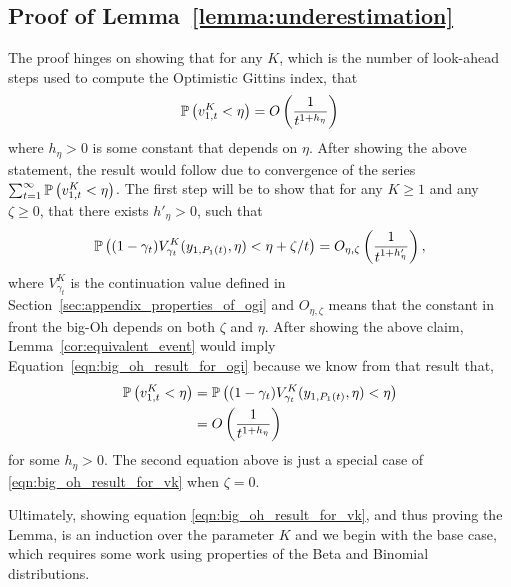 \subsection{Proof of Lemma~\ref{lemma:underestimation}} \label{proof:underestimation_proof}
\begin{myproof}[Proof.]
	The proof hinges on showing that for any $K$, which is the number of look-ahead steps used to compute the Optimistic Gittins index, that
	\begin{equation} \label{eqn:big_oh_result_for_ogi}
	\P{v^K_{1,t} < \eta} = O\left(\frac{1}{t^{1 + h_\eta}}\right)
	\end{equation}
	where $h_\eta > 0$ is some constant that depends on $\eta$. After showing the above statement, the result would follow due to convergence of the series $\sum_{t=1}^\infty \P{v^K_{1,t} < \eta}$. The first step will be to show that for any $K \ge 1$ and any $\zeta \ge 0$, that there exists $h'_\eta > 0$, such that
	\begin{equation} \label{eqn:big_oh_result_for_vk}
		\P{(1-\gamma_t)V^K_{\gamma_t}(y_{1,\Nt{1}}, \eta) < \eta + \zeta/t} = O_{\eta,\zeta}\left(\frac{1}{t^{1 + h'_\eta}}\right),
	\end{equation}
	where $V^K_{\gamma_t}$ is the continuation value defined in Section~\ref{sec:appendix_properties_of_ogi} and $O_{\eta,\zeta}$ means that the constant in front the big-Oh depends on both $\zeta$ and $\eta$. After showing the above claim, Lemma~\ref{cor:equivalent_event} would imply Equation~\eqref{eqn:big_oh_result_for_ogi} because we know from that result that,
	\begin{align*}
		\P{v^K_{1,t} < \eta} & = \P{(1-\gamma_t)V^K_{\gamma_t}(y_{1,\Nt{1}}, \eta) < \eta} \\
		& = O\left(\frac{1}{t^{1 + h_\eta}}\right)
	\end{align*}
	for some $h_\eta > 0$. The second equation above is just a special case of \eqref{eqn:big_oh_result_for_vk} when $\zeta = 0$.
	
	Ultimately, showing equation \eqref{eqn:big_oh_result_for_vk}, and thus proving the Lemma, is an induction over the parameter $K$ and we begin with the base case, which requires some work using properties of the Beta and Binomial distributions.

\end{myproof}

